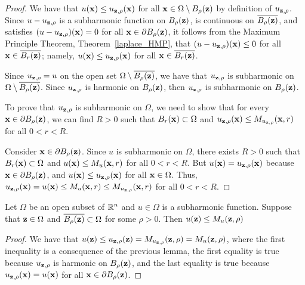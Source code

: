 \begin{proof}
 We have that $u(\mathbf{x}) \leq u_{\mathbf{z},\rho}(\mathbf{x})$ for
all $\mathbf{x} \in \Omega \setminus B_{\rho}(\mathbf{z})$ by definition of
$u_{\mathbf{z},\rho}$.
Since $u - u_{\mathbf{z},\rho}$ is a subharmonic function on $B_{\rho}(\mathbf{z})$,
is continuous on $\overline{B_{\rho}(\mathbf{z})}$, and satisfies
$(u-u_{\mathbf{z},\rho})(\mathbf{x}) = 0$ for all
$\mathbf{x} \in \partial B_{\rho}(\mathbf{z})$,
it follows from the Maximum Principle Theorem,
Theorem~\ref{laplace_HMP}, that $(u-u_{\mathbf{z},\rho})(\mathbf{x}) \leq 0$
for all $\mathbf{x} \in \overline{B_r(\mathbf{z})}$; namely,
$u(\mathbf{x}) \leq u_{\mathbf{z},\rho}(\mathbf{x})$
for all $\mathbf{x} \in \overline{B_r(\mathbf{z})}$.

  Since $u_{\mathbf{z},\rho} = u$ on the open set
$\Omega \setminus \overline{B_{\rho}(\mathbf{z})}$, we have that
$u_{\mathbf{z},\rho}$ is subharmonic on
$\Omega \setminus \overline{B_{\rho}(\mathbf{z})}$.
Since $u_{\mathbf{z},\rho}$ is harmonic on $B_\rho(\mathbf{z})$, then
$u_{\mathbf{z},\rho}$ is subharmonic on $B_\rho(\mathbf{z})$.

To prove that $u_{\mathbf{z},\rho}$ is subharmonic on $\Omega$, we need
to show that for every $\mathbf{x} \in \partial B_{\rho}(\mathbf{z})$, we
can find $R>0$ such that $B_r(\mathbf{x}) \subset \Omega$ and
$u_{\mathbf{z},\rho}(\mathbf{x}) \leq M_{u_{\mathbf{z},\rho}}(\mathbf{x},r)$
for all $0 < r < R$.

Consider $\mathbf{x} \in \partial B_{\rho}(\mathbf{z})$.  Since $u$ is
subharmonic on $\Omega$, there exists $R>0$ such that
$B_r(\mathbf{x}) \subset \Omega$ and $u(\mathbf{x}) \leq M_u(\mathbf{x},r)$
for all $0 < r < R$.  But $u(\mathbf{x}) = u_{\mathbf{z},\rho}(\mathbf{x})$ because
$\mathbf{x} \in \partial B_{\rho}(\mathbf{z})$, and
$u(\mathbf{x}) \leq u_{\mathbf{z},\rho}(\mathbf{x})$ for all $\mathbf{x} \in \Omega$.
Thus,
$u_{\mathbf{z},\rho}(\mathbf{x}) = u(\mathbf{x}) \leq M_u(\mathbf{x},r)
\leq M_{u_{\mathbf{z},\rho}}(\mathbf{x},r)$
for all $0 < r < R$.
\end{proof}

\begin{lemma} \label{PerromLem2}
Let $\Omega$ be an open subset of $\displaystyle \mathbb{R}^n$ and $u \in \Omega$ is a
subharmonic function.   Suppose that $\mathbf{z} \in \Omega$
and $\overline{B_{\rho}(\mathbf{z})} \subset \Omega$ for some $\rho >0$.  Then
$u(\mathbf{z}) \leq M_u(\mathbf{z},\rho)$
\end{lemma}

\begin{proof}
We have that
$\displaystyle
u(\mathbf{z}) \leq u_{\mathbf{z},\rho}(\mathbf{z}) = M_{u_{\mathbf{z},\rho}}(\mathbf{z},\rho)
= M_u(\mathbf{z},\rho)$,
where the first inequality is a consequence of the previous lemma, the
first equality is true because $u_{\mathbf{z},\rho}$ is harmonic on
$B_{\rho}(\mathbf{z})$, and the last equality is true because
$u_{\mathbf{z},\rho}(\mathbf{x}) = u(\mathbf{x})$ for all
$\mathbf{x} \in \partial B_{\rho}(\mathbf{z})$.
\end{proof}

